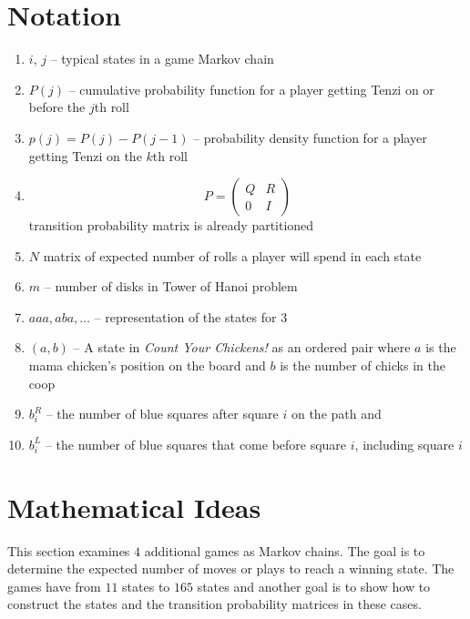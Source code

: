 \documentclass[12pt]{article}
\begin{document}
\hr

\section*{Notation}
\begin{enumerate}
    \item
        \( i \), \( j \) -- typical states in a game Markov chain
    \item
        \( P(j) \) -- cumulative probability function for a player
        getting Tenzi on or before the \( j \)th roll
    \item
        \( p(j)=P(j) - P(j - 1) \) -- probability density function for a
        player getting Tenzi on the \( k \)th roll
    \item
        \[
            P =
            \begin{pmatrix}
                Q & R \\
                0 & I
            \end{pmatrix}
        \] transition probability matrix is already partitioned
    \item
        \( N \) matrix of expected number of rolls a player will spend
        in each state
    \item
        \( m \) -- number of disks in Tower of Hanoi problem
    \item
        \( aaa, aba, \dots \) -- representation of the states for \( 3 \)
    \item
        \( (a, b) \) -- A state in \emph{Count Your Chickens!} as an
        ordered pair where \( a \) is the mama chicken's position on the
        board and \( b \) is the number of chicks in the coop
    \item
        \( b_i^R \) -- the number of blue squares after square \( i \)
        on the path and
    \item
        \( b_i^L \) -- the number of blue squares that come before
        square \( i \), including square \( i \)
\end{enumerate}

\section*{Mathematical Ideas}

This section examines \( 4 \) additional games as Markov chains.  The
goal is to determine the expected number of moves or plays to reach a
winning state.  The games have from \( 11 \) states to \( 165 \) states
and another goal is to show how to construct the states and the
transition probability matrices in these cases.
\end{document}
